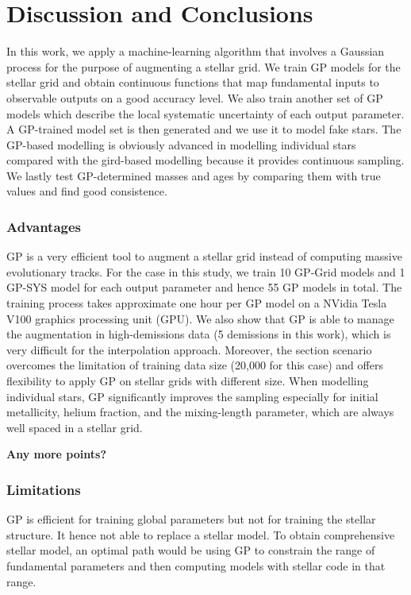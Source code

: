 \section{Discussion and Conclusions}\label{sec:conclusion}

In this work, we apply a machine-learning algorithm that involves a Gaussian process for the purpose of augmenting a stellar grid. We train GP models for the stellar grid and obtain continuous functions that map fundamental inputs to observable outputs on a good accuracy level. We also train another set of GP models which describe the local systematic uncertainty of each output parameter. A GP-trained model set is then generated and we use it to model fake stars. The GP-based modelling is obviously advanced in modelling individual stars compared with the gird-based modelling because it provides continuous sampling. We lastly test GP-determined masses and ages by comparing them with true values and find good consistence. 

\subsubsection*{Advantages}
GP is a very efficient tool to augment a stellar grid instead of computing massive evolutionary tracks. For the case in this study, we train 10 GP-Grid models and 1 GP-SYS model for each output parameter and hence 55 GP models in total. The training process takes approximate one hour per GP model on a NVidia Tesla V100 graphics processing unit (GPU). 
%
We also show that GP is able to manage the augmentation in high-demissions data (5 demissions in this work), which is very difficult for the interpolation approach.
%
Moreover, the section scenario overcomes the limitation of training data size (20,000 for this case) and offers flexibility to apply GP on stellar grids with different size. 
%
When modelling individual stars, GP significantly improves the sampling especially for initial metallicity, helium fraction, and the mixing-length parameter, which are always well spaced in a stellar grid. 
%

{\bf Any more points?}    

\subsubsection*{Limitations}
GP is efficient for training global parameters but not for training the stellar structure. It hence not able to replace a stellar model. To obtain comprehensive stellar model, an optimal path would be using GP to constrain the range of fundamental parameters and then computing models with stellar code in that range.
%

